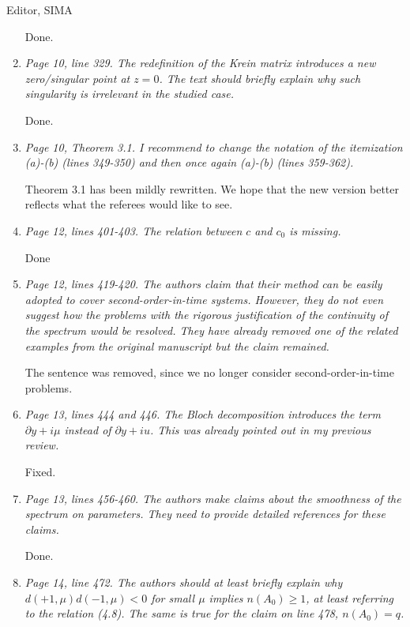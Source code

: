 \documentclass[11pt]{letter}
\begin{document}
\begin{letter}{Editor, SIMA}
\begin{enumerate}
Done.

\item \emph{Page 10, line 329. The redefinition of the Krein matrix introduces a new zero/singular point at $z = 0$. The text should briefly explain why such singularity is irrelevant in the studied case.}
\vspace{4mm}

Done.

\item \emph{Page 10, Theorem 3.1. I recommend to change the notation of the itemization (a)-(b) (lines 349-350) and then once again (a)-(b) (lines 359-362).}
\vspace{4mm}

Theorem 3.1 has been mildly rewritten.  We hope that the new version better reflects what the referees would like to see.

\item \emph{Page 12, lines 401-403. The relation between $c$ and $c_0$ is missing.}
\vspace{4mm}

Done

\item \emph{Page 12, lines 419-420. The authors claim that their method can be easily adopted to cover second-order-in-time systems. However, they do not even suggest how the problems with the rigorous justification of the continuity of the spectrum would be resolved. They have already removed one of the related examples from the original manuscript but the claim remained.}
\vspace{4mm}

The sentence was removed, since we no longer consider second-order-in-time problems.

\item \emph{Page 13, lines 444 and 446. The Bloch decomposition introduces the term $\partial y + i \mu$ instead of $\partial y + i u$. This was already pointed out in my previous review.}
\vspace{4mm}

Fixed.

\item \emph{Page 13, lines 456-460. The authors make claims about the smoothness of the spectrum on parameters. They need to provide detailed references for these claims.}
\vspace{4mm}

Done.

\item \emph{Page 14, line 472. The authors should at least briefly explain why $d(+1,\mu)d(-1,\mu) < 0$ for small $\mu$ implies $n(A_0) \geq 1$, at least referring to the relation (4.8). The same is true for the claim on line 478, $n(A_0) = q$.}
\vspace{4mm}


\end{enumerate}
\end{letter}
\end{document}
